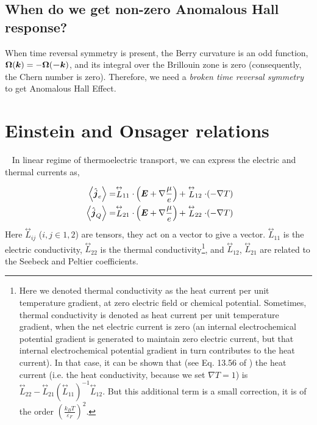 \documentclass{report}
\renewcommand\vec[1]{\ensuremath\boldsymbol{#1}} %
\begin{document}
\subsection{When do we get non-zero Anomalous Hall response?}
When time reversal symmetry is present, the Berry curvature is an odd function, $\vec{\Omega}(\vec{k}) = - \vec{\Omega}(\vec{-k})$, and its integral over the Brillouin zone is zero (consequently, the Chern number is zero).
Therefore, we need a \textit{broken time reversal symmetry} to get Anomalous Hall Effect.


\section{Einstein and Onsager relations}~\label{sec:Einstein-Onsager}
In linear regime of thermoelectric transport, we 
can express the electric and thermal currents as,

\begin{equation}~\label{Eq:TrasportCoeffs}
	\begin{aligned}
		\expval{\hat{\vec{j}}_e} &= \stackrel{\leftrightarrow}{L}_{11} \cdot \left(\vec{E} + \nabla \frac{\mu}{e}\right) + \stackrel{\leftrightarrow}{L}_{12} \cdot (-\nabla{T})  \\
		\expval{\hat{\vec{j}}_Q} &= \stackrel{\leftrightarrow}{L}_{21} \cdot \left(\vec{E} + \nabla \frac{\mu}{e}\right)  + \stackrel{\leftrightarrow}{L}_{22} \cdot (-\nabla{T}) 
	\end{aligned}
\end{equation}
Here $\stackrel{\leftrightarrow}{L}_{i j}$ ($i,j \in {1,2}$) are tensors, they act on a vector to give a vector. $\stackrel{\leftrightarrow}{L}_{1 1}$ is the electric conductivity, $\stackrel{\leftrightarrow}{L}_{2 2}$ is the thermal conductivity\footnote{Here we denoted thermal conductivity as the heat current per unit temperature gradient, at zero electric field or chemical potential. Sometimes, thermal conductivity is denoted as heat current per unit temperature gradient, when the net electric current is zero (an internal electrochemical potential gradient is generated to maintain zero electric current, but that internal electrochemical potential gradient in turn contributes to the heat current). In that case, it can be shown that (see Eq. 13.56 of \cite{book:AshcroftMermin76}) the heat current (i.e. the heat conductivity, because we set $\nabla T = 1$) is $\stackrel{\leftrightarrow}{L}_{22} - \stackrel{\leftrightarrow}{L}_{21} (\stackrel{\leftrightarrow}{L}_{11})^{-1} \stackrel{\leftrightarrow}{L}_{12}$. But this additional term is a small correction, it is of the order $\left(\frac{k_B T}{\varepsilon_F}\right)^2$.}, and $\stackrel{\leftrightarrow}{L}_{1 2}$, $\stackrel{\leftrightarrow}{L}_{2 1}$ are related to the Seebeck and Peltier coefficients.
\end{document}
